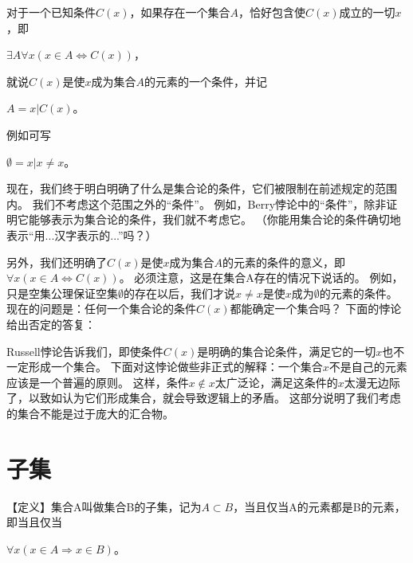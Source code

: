 对于一个已知条件$C(x)$，如果存在一个集合$A$，恰好包含使$C(x)$成立的一切$x$，即
\begin{center}
$\exists A \forall x (x \in A \Leftrightarrow C(x))$，
\end{center}
就说$C(x)$是使$x$成为集合$A$的元素的一个条件，并记
\begin{center}
$A={x|C(x)}$。
\end{center}

例如可写
\begin{center}
$\emptyset={x|x \neq x}$。
\end{center}

现在，我们终于明白明确了什么是集合论的条件，它们被限制在前述规定的范围内。
我们不考虑这个范围之外的“条件”。
例如，Berry悖论中的“条件”，除非证明它能够表示为集合论的条件，我们就不考虑它。
（你能用集合论的条件确切地表示“用...汉字表示的...”吗？）

另外，我们还明确了$C(x)$是使$x$成为集合$A$的元素的条件的意义，即$\forall x (x \in A \Leftrightarrow C(x))$。
必须注意，这是在集合A存在的情况下说话的。
例如，只是空集公理保证空集$\emptyset$的存在以后，我们才说$x \neq x$是使$x$成为$\emptyset$的元素的条件。
现在的问题是：任何一个集合论的条件$C(x)$都能确定一个集合吗？
下面的悖论给出否定的答复：


Russell悖论告诉我们，即使条件$C(x)$是明确的集合论条件，满足它的一切$x$也不一定形成一个集合。
下面对这悖论做些非正式的解释：一个集合$x$不是自己的元素应该是一个普遍的原则。
这样，条件$x \notin x$太广泛论，满足这条件的$x$太漫无边际了，以致如认为它们形成集合，就会导致逻辑上的矛盾。
这部分说明了我们考虑的集合不能是过于庞大的汇合物。

\section{子集}

【定义】集合A叫做集合B的子集，记为$A \subset B$，当且仅当A的元素都是B的元素，即当且仅当
\begin{center}
$\forall x (x \in A \Rightarrow x \in B)$。
\end{center}

